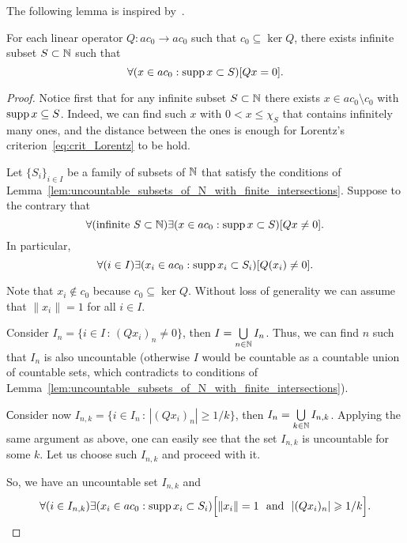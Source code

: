 The following lemma is inspired by~\cite{mathSE_Phillips}.

\begin{lemma}
	\label{lem:c_0_not_complemented_in_ac_0}
	For each linear operator $Q: ac_0 \to ac_0$ such that $c_0\subseteq \ker Q$,
	there exists infinite subset $S \subset \mathbb{N}$ such that
	\begin{equation}
		\forall(x \in ac_0 : \operatorname{supp} x \subset S)[Qx = 0]
		.
	\end{equation}
\end{lemma}



\begin{proof}
	Notice first that for any infinite subset $S \subset \mathbb{N}$
	there exists $x\in ac_0\setminus c_0$ with $\operatorname{supp} x \subseteq S$.
	Indeed, we can find such $x$ with $0 < x \leq \chi_S$
	that contains infinitely many ones, and the distance between the ones
	is enough for Lorentz's criterion~\eqref{eq:crit_Lorentz} to be hold.



	Let $\{S_i\}_{i \in I}$ be a family of subsets of $\mathbb{N}$
	that satisfy the conditions of Lemma~\ref{lem:uncountable_subsets_of_N_with_finite_intersections}.
	Suppose to the contrary that
	\begin{equation}
		\forall(\mbox{infinite }S\subset\mathbb{N})\exists(x \in ac_0 : \operatorname{supp} x \subset S)[Qx \neq 0]
		.
	\end{equation}
	In particular,
	\begin{equation}
		\forall(i\in I)\exists(x_i \in ac_0 : \operatorname{supp} x_i \subset S_i)[Q(x_i) \neq 0]
		.
	\end{equation}

	Note that $x_i \notin c_0$ because $c_0\subseteq \ker Q$.
	Without loss of generality we can assume that $\|x_i\|=1$ for all $i \in I$.

	Consider $I_n = \{i \in I\,:\,(Qx_i)_n \neq 0\}$,
	then $I = \bigcup\limits_{n\in\mathbb{N}} I_n$.
	Thus, we can find $n$ such that $I_n$ is also uncountable
	(otherwise $I$ would be countable as a countable union of countable sets,
	which contradicts to conditions of Lemma~\ref{lem:uncountable_subsets_of_N_with_finite_intersections}).

	Сonsider now $I_{n,k} = \{i \in I_n\,:\,|(Qx_i)_n| \geq 1/k\}$,
	then $I_n = \bigcup\limits_{k\in\mathbb{N}} I_{n,k}$.
	Applying the same argument as above, one can easily see that the set $I_{n,k}$ is uncountable for some $k$.
	Let us choose such $I_{n,k}$ and proceed with it.

	So, we have an uncountable set $I_{n,k}$ and
	\begin{equation}
		\forall(i\in I_{n,k})\exists(x_i \in ac_0 : \operatorname{supp} x_i \subset S_i)\Bigl[\|x_i\|=1 \mbox{~~and~~} |(Qx_i)_n| \geqslant 1/k\Bigr]
		.
	\end{equation}


\end{proof}
